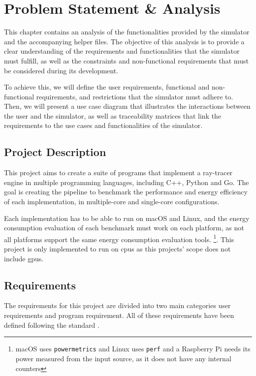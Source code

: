 \chapter{Problem Statement \& Analysis}\label{chap:analysis}

This chapter contains an analysis of the functionalities provided by the simulator and the accompanying helper files. The objective of this analysis is to provide a clear understanding of the requirements and functionalities that the simulator must fulfill, as well as the constraints and non-functional requirements that must be considered during its development.

To achieve this, we will define the user requirements, functional and non-functional requirements, and restrictions that the simulator must adhere to. Then, we will present a use case diagram that illustrates the interactions between the user and the simulator, as well as traceability matrices that link the requirements to the use cases and functionalities of the simulator.

\section{Project Description}
This project aims to create a suite of programs that implement a ray-tracer engine in multiple programming languages, including C++, Python and Go. The goal is creating the pipeline to benchmark the performance and energy efficiency of each implementation, in multiple-core and single-core configurations.

Each implementation has to be able to run on macOS and Linux, and the energy consumption evaluation of each benchmark must work on each platform, as not all platforms support the same energy consumption evaluation tools. \footnote{macOS uses \texttt{powermetrics} and Linux uses \texttt{perf} and a Raspberry Pi needs its power measured from the input source, as it does not have any internal counters}. This project is only implemented to run on \glspl{cpu} as this projects' scope does not include \glspl{gpu}.


\section{Requirements}


The requirements for this project are divided into two main categories user requirements and program requirement. All of these requirements have been defined following the standard \cite{requirements-engineering-iso}. 


